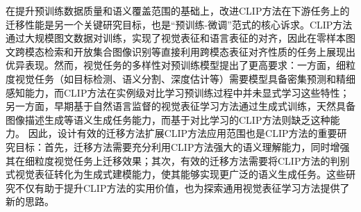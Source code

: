 
在提升预训练数据质量和语义覆盖范围的基础上，改进CLIP方法在下游任务上的迁移性能是另一个关键研究目标，也是“预训练-微调”范式的核心诉求。CLIP方法通过大规模图文数据对训练，实现了视觉表征和语言表征的对齐，因此在零样本图文跨模态检索和开放集合图像识别等直接利用跨模态表征对齐性质的任务上展现出优异表现。然而，视觉任务的多样性对预训练模型提出了更高要求：一方面，细粒度视觉任务（如目标检测、语义分割、深度估计等）需要模型具备密集预测和精细感知能力，而CLIP方法在实例级对比学习预训练过程中并未显式学习这些特性；另一方面，早期基于自然语言监督的视觉表征学习方法\cite{desai2021virtex}通过生成式训练，天然具备图像描述生成等语义生成任务能力，而基于对比学习的CLIP方法则缺乏这种能力。
因此，设计有效的迁移方法扩展CLIP方法应用范围也是CLIP方法的重要研究目标：首先，迁移方法需要充分利用CLIP方法强大的语义理解能力，同时增强其在细粒度视觉任务上迁移效果；其次，有效的迁移方法需要将CLIP方法的判别式视觉表征转化为生成式建模能力，使其能够实现更广泛的语义生成任务。这些研究不仅有助于提升CLIP方法的实用价值，也为探索通用视觉表征学习方法提供了新的思路。




